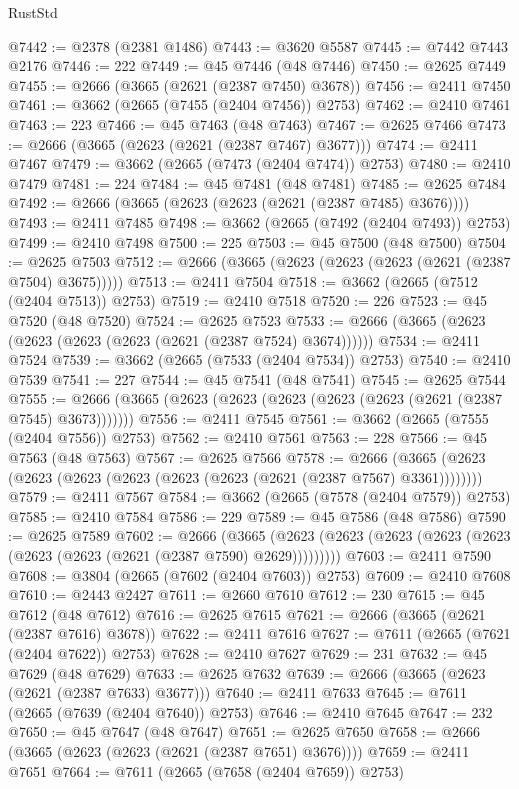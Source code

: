 \begin{lexlean}{RustStd}
\begin{coremodule}
@7442 := @2378 (@2381 @1486)
@7443 := @3620 @5587
@7445 := @7442 @7443 @2176
@7446 := 222
@7449 := @45 @7446 (@48 @7446)
@7450 := @2625 @7449
@7455 := @2666 (@3665 (@2621 (@2387 @7450) @3678))
@7456 := @2411 @7450
@7461 := @3662 (@2665 (@7455 (@2404 @7456)) @2753)
@7462 := @2410 @7461
@7463 := 223
@7466 := @45 @7463 (@48 @7463)
@7467 := @2625 @7466
@7473 := @2666 (@3665 (@2623 (@2621 (@2387 @7467) @3677)))
@7474 := @2411 @7467
@7479 := @3662 (@2665 (@7473 (@2404 @7474)) @2753)
@7480 := @2410 @7479
@7481 := 224
@7484 := @45 @7481 (@48 @7481)
@7485 := @2625 @7484
@7492 := @2666 (@3665 (@2623 (@2623 (@2621 (@2387 @7485) @3676))))
@7493 := @2411 @7485
@7498 := @3662 (@2665 (@7492 (@2404 @7493)) @2753)
@7499 := @2410 @7498
@7500 := 225
@7503 := @45 @7500 (@48 @7500)
@7504 := @2625 @7503
@7512 := @2666 (@3665 (@2623 (@2623 (@2623 (@2621 (@2387 @7504) @3675)))))
@7513 := @2411 @7504
@7518 := @3662 (@2665 (@7512 (@2404 @7513)) @2753)
@7519 := @2410 @7518
@7520 := 226
@7523 := @45 @7520 (@48 @7520)
@7524 := @2625 @7523
@7533 := @2666 (@3665 (@2623 (@2623 (@2623 (@2623 (@2621 (@2387 @7524) @3674))))))
@7534 := @2411 @7524
@7539 := @3662 (@2665 (@7533 (@2404 @7534)) @2753)
@7540 := @2410 @7539
@7541 := 227
@7544 := @45 @7541 (@48 @7541)
@7545 := @2625 @7544
@7555 := @2666 (@3665 (@2623 (@2623 (@2623 (@2623 (@2623 (@2621 (@2387 @7545) @3673)))))))
@7556 := @2411 @7545
@7561 := @3662 (@2665 (@7555 (@2404 @7556)) @2753)
@7562 := @2410 @7561
@7563 := 228
@7566 := @45 @7563 (@48 @7563)
@7567 := @2625 @7566
@7578 := @2666 (@3665 (@2623 (@2623 (@2623 (@2623 (@2623 (@2623 (@2621 (@2387 @7567) @3361))))))))
@7579 := @2411 @7567
@7584 := @3662 (@2665 (@7578 (@2404 @7579)) @2753)
@7585 := @2410 @7584
@7586 := 229
@7589 := @45 @7586 (@48 @7586)
@7590 := @2625 @7589
@7602 := @2666
    (@3665 (@2623 (@2623 (@2623 (@2623 (@2623 (@2623 (@2623 (@2621 (@2387 @7590) @2629)))))))))
@7603 := @2411 @7590
@7608 := @3804 (@2665 (@7602 (@2404 @7603)) @2753)
@7609 := @2410 @7608
@7610 := @2443 @2427
@7611 := @2660 @7610
@7612 := 230
@7615 := @45 @7612 (@48 @7612)
@7616 := @2625 @7615
@7621 := @2666 (@3665 (@2621 (@2387 @7616) @3678))
@7622 := @2411 @7616
@7627 := @7611 (@2665 (@7621 (@2404 @7622)) @2753)
@7628 := @2410 @7627
@7629 := 231
@7632 := @45 @7629 (@48 @7629)
@7633 := @2625 @7632
@7639 := @2666 (@3665 (@2623 (@2621 (@2387 @7633) @3677)))
@7640 := @2411 @7633
@7645 := @7611 (@2665 (@7639 (@2404 @7640)) @2753)
@7646 := @2410 @7645
@7647 := 232
@7650 := @45 @7647 (@48 @7647)
@7651 := @2625 @7650
@7658 := @2666 (@3665 (@2623 (@2623 (@2621 (@2387 @7651) @3676))))
@7659 := @2411 @7651
@7664 := @7611 (@2665 (@7658 (@2404 @7659)) @2753)

\end{coremodule}
\end{lexlean}
